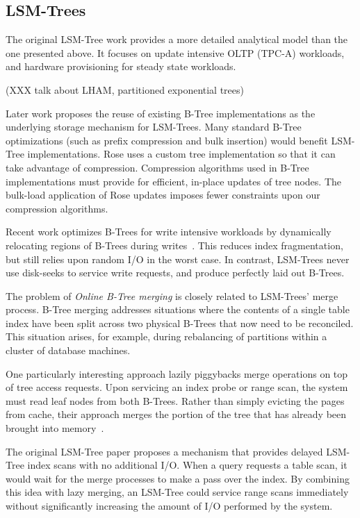 \documentclass{vldb}
\newcommand{\rows}{Rose\xspace}
\begin{document}
\subsection{LSM-Trees}

The original LSM-Tree work\cite{lsm} provides a more detailed
analytical model than the one presented above.  It focuses on update
intensive OLTP (TPC-A) workloads, and hardware provisioning for steady
state workloads.

(XXX talk about LHAM, partitioned exponential trees)

Later work proposes the reuse of existing B-Tree implementations as
the underlying storage mechanism for LSM-Trees\cite{cidrPartitionedBTree}.  Many
standard B-Tree optimizations (such as prefix compression and bulk insertion)
would benefit LSM-Tree implementations.  \rows uses a custom tree
implementation so that it can take advantage of compression.
Compression algorithms used in B-Tree implementations must provide for
efficient, in-place updates of tree nodes.  The bulk-load application of
\rows updates imposes fewer constraints upon our compression
algorithms.

Recent work optimizes B-Trees for write intensive workloads by dynamically
relocating regions of B-Trees during
writes~\cite{bTreeHighUpdateRates}.  This reduces index fragmentation,
but still relies upon random I/O in the worst case.  In contrast,
LSM-Trees never use disk-seeks to service write requests, and produce
perfectly laid out B-Trees.

The problem of {\em Online B-Tree merging} is closely related to
LSM-Trees' merge process.  B-Tree merging addresses situations where
the contents of a single table index have been split across two
physical B-Trees that now need to be reconciled.  This situation
arises, for example, during rebalancing of partitions within a cluster
of database machines.

One particularly interesting approach lazily piggybacks merge
operations on top of tree access requests.  Upon servicing an index
probe or range scan, the system must read leaf nodes from both B-Trees.
Rather than simply evicting the pages from cache, their approach merges
the portion of the tree that has already been brought into
memory~\cite{onlineMerging}.

The original LSM-Tree paper proposes a mechanism that provides delayed
LSM-Tree index scans with no additional I/O.  When a query requests a table scan, it would wait for
the merge processes to make a pass over the index.
By combining this idea with lazy merging, an LSM-Tree could service
range scans immediately without significantly increasing the amount of
I/O performed by the system.
\end{document}
